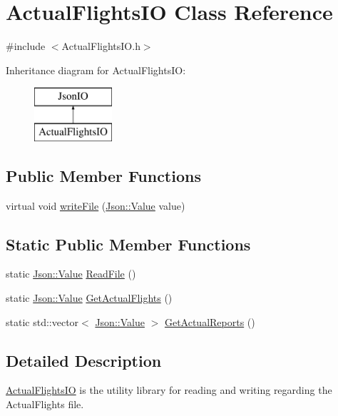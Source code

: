 \hypertarget{class_actual_flights_i_o}{}\section{Actual\+Flights\+IO Class Reference}
\label{class_actual_flights_i_o}


{\ttfamily \#include $<$Actual\+Flights\+I\+O.\+h$>$}

Inheritance diagram for Actual\+Flights\+IO\+:\begin{figure}[H]
\begin{center}
\leavevmode
\includegraphics[height=2.000000cm]{class_actual_flights_i_o}
\end{center}
\end{figure}
\subsection*{Public Member Functions}
\begin{DoxyCompactItemize}
\item 
virtual void \hyperlink{class_actual_flights_i_o_a181dc53214b2e3d7d21c28d928e5f07b}{write\+File} (\hyperlink{class_json_1_1_value}{Json\+::\+Value} value)
\end{DoxyCompactItemize}
\subsection*{Static Public Member Functions}
\begin{DoxyCompactItemize}
\item 
static \hyperlink{class_json_1_1_value}{Json\+::\+Value} \hyperlink{class_actual_flights_i_o_a86f2cdffea634247d0b08aceed8106f9}{Read\+File} ()
\item 
static \hyperlink{class_json_1_1_value}{Json\+::\+Value} \hyperlink{class_actual_flights_i_o_a1b35a3e51049fb95e8c0acb9f6abea9a}{Get\+Actual\+Flights} ()
\item 
static std\+::vector$<$ \hyperlink{class_json_1_1_value}{Json\+::\+Value} $>$ \hyperlink{class_actual_flights_i_o_a7a0b1fea02b459f91c6e1bea365ab6c7}{Get\+Actual\+Reports} ()
\end{DoxyCompactItemize}


\subsection{Detailed Description}
\hyperlink{class_actual_flights_i_o}{Actual\+Flights\+IO} is the utility library for reading and writing regarding the Actual\+Flights file. 

